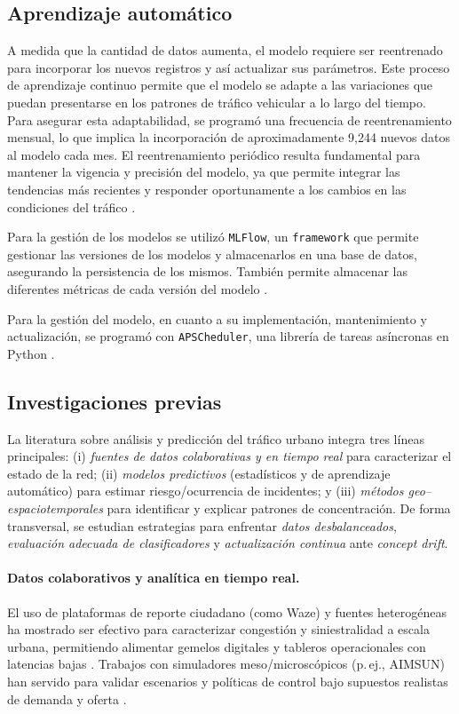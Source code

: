 \documentclass[12pt]{article}
\begin{document}
\subsection{Aprendizaje automático}

A medida que la cantidad de datos aumenta, el modelo requiere ser reentrenado para incorporar los nuevos registros y así actualizar sus parámetros. Este proceso de aprendizaje continuo permite que el modelo se adapte a las variaciones que puedan presentarse en los patrones de tráfico vehicular a lo largo del tiempo. Para asegurar esta adaptabilidad, se programó una frecuencia de reentrenamiento mensual, lo que implica la incorporación de aproximadamente 9,244 nuevos datos al modelo cada mes. El reentrenamiento periódico resulta fundamental para mantener la vigencia y precisión del modelo, ya que permite integrar las tendencias más recientes y responder oportunamente a los cambios en las condiciones del tráfico \parencite{gama2014concept}.


Para la gestión de los modelos se utilizó \texttt{MLFlow}, un \texttt{framework} que permite gestionar las versiones de los modelos y almacenarlos en una base de datos, asegurando la persistencia de los mismos. También permite almacenar las diferentes métricas de cada versión del modelo \parencite{mlflow2025}.

Para la gestión del modelo, en cuanto a su implementación, mantenimiento y actualización, se programó con \texttt{APSCheduler}, una librería de tareas asíncronas en Python \parencite{apscheduler2025}.

\subsection{Investigaciones previas}

La literatura sobre análisis y predicción del tráfico urbano integra tres líneas principales: (i) \textit{fuentes de datos colaborativas y en tiempo real} para caracterizar el estado de la red; (ii) \textit{modelos predictivos} (estadísticos y de aprendizaje automático) para estimar riesgo/ocurrencia de incidentes; y (iii) \textit{métodos geo–espaciotemporales} para identificar y explicar patrones de concentración. De forma transversal, se estudian estrategias para enfrentar \textit{datos desbalanceados}, \textit{evaluación adecuada de clasificadores} y \textit{actualización continua} ante \textit{concept drift}.

\paragraph{Datos colaborativos y analítica en tiempo real.}
El uso de plataformas de reporte ciudadano (como Waze) y fuentes heterogéneas ha mostrado ser efectivo para caracterizar congestión y siniestralidad a escala urbana, permitiendo alimentar gemelos digitales y tableros operacionales con latencias bajas \parencite{chen2015, ferreira2017waze, wazecitiescasestudies2024}. Trabajos con simuladores meso/microscópicos (p.\,ej., AIMSUN) han servido para validar escenarios y políticas de control bajo supuestos realistas de demanda y oferta \parencite{barcelo2005}.
\end{document}
